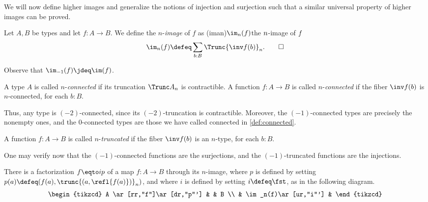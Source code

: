 We will now define higher images and generalize the notions
of injection and surjection such that a similar
universal property of higher images can be proved.

\begin{definition}\label{def:n-image}
  Let $A,B$ be types and let $f : A \to B$. We define the $n$-\emph{image} of $f$ as
  \glossary(iman){$\protect\im_n(f)$}{the $\protect n$-image of $\protect f$}
  \[
    \im_n(f) \defeq \sum_{b:B}\Trunc{\inv f (b)}_n.\qedhere
  \]
\end{definition}

Observe that $\im_{-1}(f) \jdeq \im(f)$.

\begin{definition}\label{def:n-connected}
  A type $A$ is called $n$-\emph{connected}
  if its truncation $\Trunc A _ n$ is contractible.
  A function $f : A \to B$ is called $n$-\emph{connected}
  if the fiber $\inv f (b)$ is $n$-connected, for each $b:B$.
\end{definition}

Thus, any type is $(-2)$-connected, since its $(-2)$-truncation is contractible.
Moreover, the $(-1)$-connected types are precisely the nonempty ones,
and the $0$-connected types are those we have called connected in \cref{def:connected}.

\begin{definition}\label{def:n-truncated}
  A function $f : A \to B$ is called $n$-\emph{truncated}
  if the fiber $\inv f (b)$ is an $n$-type, for each $b:B$.
\end{definition}

One may verify now that the $(-1)$-connected functions are the surjections, and
the $(-1)$-truncated functions are the injections.

There is a factorization $f \eqto ip$ of a map $f : A \to B$
through its $n$-image,
where $p$ is defined by setting $p(a)\defeq (f(a),\trunc{(a,\refl{f(a)})}_n)$,
and where $i$ is defined by setting $i\defeq\fst$, as in the following diagram.
\begin{equation}\label{eqn:n-image-factorization}
    \begin{tikzcd}
      A \ar[rr,"f"]\ar[dr,"p"'] & & B \\
      & \im_n(f)\ar[ur,"i"'] &
    \end{tikzcd}
\end{equation}

